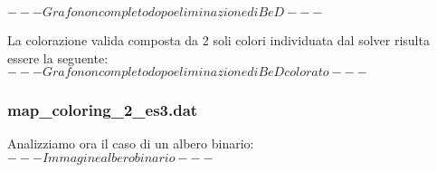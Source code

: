 \documentclass{article}
\begin{document}
$ --- Grafo non completo dopo eliminazione di B e D --- $

La colorazione valida composta da 2 soli colori individuata dal solver risulta essere la seguente:\\

$ --- Grafo non completo dopo eliminazione di B e D colorato --- $

\pagebreak

\subsubsection{map\_coloring\_2\_es3.dat}
Analizziamo ora il caso di un albero binario:\\

$ --- Immagine albero binario --- $\\
\end{document}
